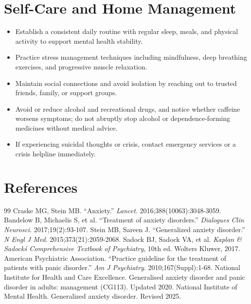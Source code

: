 \section*{Self-Care and Home Management}
\begin{itemize}
 \item Establish a consistent daily routine with regular sleep, meals, and physical activity to support mental health stability.
 \item Practice stress management techniques including mindfulness, deep breathing exercises, and progressive muscle relaxation.
 \item Maintain social connections and avoid isolation by reaching out to trusted friends, family, or support groups.
 \item Avoid or reduce alcohol and recreational drugs, and notice whether caffeine worsens symptoms; do not abruptly stop alcohol or dependence-forming medicines without medical advice.
 \item If experiencing suicidal thoughts or crisis, contact emergency services or a crisis helpline immediately.
\end{itemize}

\section*{References}
\begin{thebibliography}{99}
 Craske MG, Stein MB. ``Anxiety.'' \textit{Lancet}. 2016;388(10063):3048-3059.
 Bandelow B, Michaelis S, et al. ``Treatment of anxiety disorders.'' \textit{Dialogues Clin Neurosci}. 2017;19(2):93-107.
 Stein MB, Sareen J. ``Generalized anxiety disorder.'' \textit{N Engl J Med}. 2015;373(21):2059-2068.
 Sadock BJ, Sadock VA, et al. \textit{Kaplan \& Sadock\'s Comprehensive Textbook of Psychiatry}, 10th ed. Wolters Kluwer, 2017.
 American Psychiatric Association. ``Practice guideline for the treatment of patients with panic disorder.'' \textit{Am J Psychiatry}. 2010;167(Suppl):1-68.
 National Institute for Health and Care Excellence. Generalised anxiety disorder and panic disorder in adults: management (CG113). Updated 2020.
 National Institute of Mental Health. Generalized anxiety disorder. Revised 2025.
\end{thebibliography}
